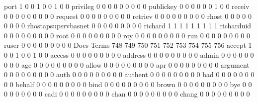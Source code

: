 \documentclass[compress,8pt]{beamer}
\begin{document}
\begin{frame}
\begin{Schunk}
  port                                       1   0   0   1   0   0   1   0   0
  privileg                                   0   0   0   0   0   0   0   0   0
  publickey                                  0   0   0   0   0   0   1   0   0
  receiv                                     0   0   0   0   0   0   0   0   0
  request                                    0   0   0   0   0   0   0   0   0
  retriev                                    0   0   0   0   0   0   0   0   0
  rhost                                      0   0   0   0   0   0   0   0   0
  rhostapsupsrvbasnet                        0   0   0   0   0   0   0   0   0
  richard                                    1   1   1   1   1   1   1   1   1
  richarduid                                 0   0   0   0   0   0   0   0   0
  root                                       0   0   0   0   0   0   0   0   0
  roy                                        0   0   0   0   0   0   0   0   0
  run                                        0   0   0   0   0   0   0   0   0
  ruser                                      0   0   0   0   0   0   0   0   0
                                          Docs
Terms                                      748 749 750 751 752 753 754 755 756
  accept                                     1   0   0   1   0   0   1   0   0
  access                                     0   0   0   0   0   0   0   0   0
  address                                    0   0   0   0   0   0   0   0   0
  admin                                      0   0   0   0   0   0   0   0   0
  age                                        0   0   0   0   0   0   0   0   0
  allow                                      0   0   0   0   0   0   0   0   0
  apr                                        0   0   0   0   0   0   0   0   0
  argument                                   0   0   0   0   0   0   0   0   0
  auth                                       0   0   0   0   0   0   0   0   0
  authent                                    0   0   0   0   0   0   0   0   0
  bad                                        0   0   0   0   0   0   0   0   0
  behalf                                     0   0   0   0   0   0   0   0   0
  bind                                       0   0   0   0   0   0   0   0   0
  brown                                      0   0   0   0   0   0   0   0   0
  bye                                        0   0   0   0   0   0   0   0   0
  cadi                                       0   0   0   0   0   0   0   0   0
  chan                                       0   0   0   0   0   0   0   0   0
  chang                                      0   0   0   0   0   0   0   0   0

\end{Schunk}
\end{frame}
\end{document}
